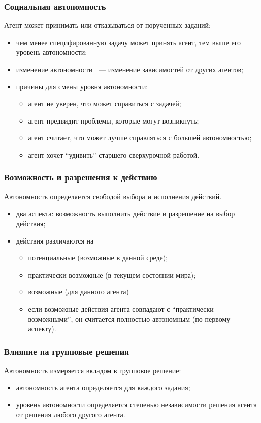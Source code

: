 \documentclass{beamer}
\begin{document}
\begin{frame}
  \frametitle{Социальная автономность}
  Агент может принимать или отказываться от порученных заданий:
  \begin{itemize}
    \item чем менее специфированную задачу может принять агент, тем выше его уровень автономности;
    \item изменение автономности ~--- изменение зависимостей от других агентов;
    \item причины для смены уровня автономности:
      \begin{itemize}
        \item агент не уверен, что может справиться с задачей;
        \item агент предвидит проблемы, которые могут возникнуть;
        \item агент считает, что может лучше справляться с большей автономностью;
        \item агент хочет ``удивить'' старшего сверхурочной работой.
      \end{itemize}
  \end{itemize}
\end{frame}

\begin{frame}
  \frametitle{Возможность и разрешения к действию}
  Автономность определяется свободой выбора и исполнения действий.
  \begin{itemize}
    \item два аспекта: возможность выполнить действие и разрешение на выбор действия;
    \item действия различаются на
      \begin{itemize}
        \item потенциальные (возможные в данной среде);
        \item практически возможные (в текущем состоянии мира);
        \item возможные (для данного агента)
        \item если возможные действия агента совпадают с ``практически возможными'',
          он считается полностью автономным (по первому аспекту).
      \end{itemize}
  \end{itemize}
\end{frame}

\begin{frame}
  \frametitle{Влияние на групповые решения}
  Автономность измеряется вкладом в групповое решение:
  \begin{itemize}
    \item автономность агента определяется для каждого задания;
    \item уровень автономности определяется степенью независимости
      решения агента от решения любого другого агента.
  \end{itemize}
\end{frame}
\end{document}
